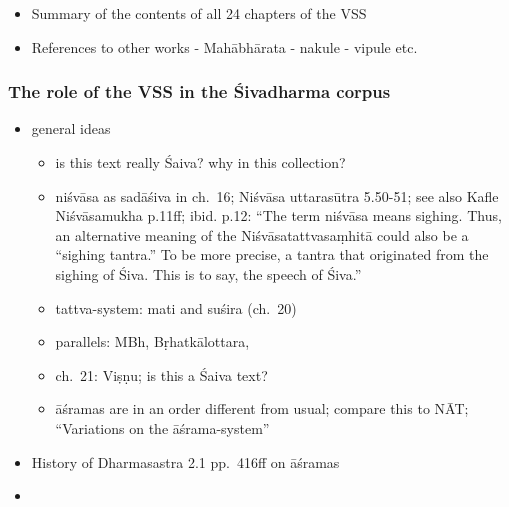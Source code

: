 \documentclass[12pt]{book}
\begin{document}
\begin{itemize}

\item
  Summary of the contents of all 24 chapters of the VSS
\item
  References to other works - Mahābhārata - nakule - vipule etc.
\end{itemize}

{%
\subsubsection{The role of the VSS in the Śivadharma
corpus}\label{the-role-of-the-vss-in-the-ux15bivadharma-corpus}}

\begin{itemize}
\item
  general ideas

  \begin{itemize}
  
  \item
    is this text really Śaiva? why in this collection?
  \item
    niśvāsa as sadāśiva in ch.~16; Niśvāsa uttarasūtra 5.50-51; see also
    Kafle Niśvāsamukha p.11ff; ibid. p.12: ``The term niśvāsa means
    sighing. Thus, an alternative meaning of the Niśvāsatattvasaṃhitā
    could also be a ``sighing tantra.'' To be more precise, a tantra
    that originated from the sighing of Śiva. This is to say, the speech
    of Śiva.''
  \item
    tattva-system: mati and suśira (ch.~20)
  \item
    parallels: MBh, Bṛhatkālottara,
  \item
    ch.~21: Viṣṇu; is this a Śaiva text?
  \item
    āśramas are in an order different from usual; compare this to NĀT;
    ``Variations on the āśrama-system''
  \end{itemize}
\item
  History of Dharmasastra 2.1 pp.~416ff on āśramas
\item
  \begin{enumerate}
  \def\labelenumi{\alph{enumi}.}
  \setcounter{enumi}{13}
  

\end{enumerate}
\end{itemize}
\end{document}
